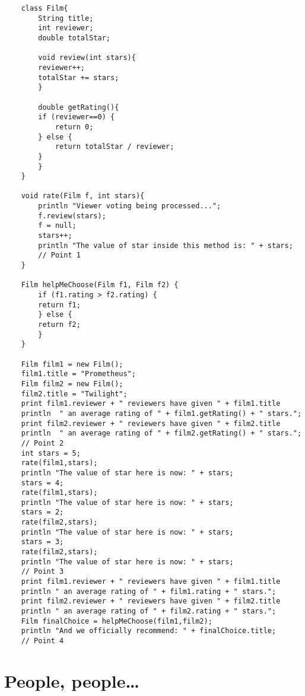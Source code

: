 \documentclass{article}
\begin{document}
\begin{verbatim}
    class Film{
        String title;
        int reviewer;
        double totalStar;     
      
        void review(int stars){
        reviewer++;
        totalStar += stars;
        }
      
        double getRating(){
        if (reviewer==0) {
            return 0;
        } else {
            return totalStar / reviewer;
        }
        }
    }
    
    void rate(Film f, int stars){
        println "Viewer voting being processed...";
        f.review(stars);
        f = null;
        stars++;
        println "The value of star inside this method is: " + stars;
        // Point 1
    }
    
    Film helpMeChoose(Film f1, Film f2) {
        if (f1.rating > f2.rating) {
        return f1;
        } else {
        return f2;
        }
    }
    
    Film film1 = new Film();
    film1.title = "Prometheus";
    Film film2 = new Film();
    film2.title = "Twilight";
    print film1.reviewer + " reviewers have given " + film1.title
    println  " an average rating of " + film1.getRating() + " stars.";
    print film2.reviewer + " reviewers have given " + film2.title
    println  " an average rating of " + film2.getRating() + " stars.";
    // Point 2
    int stars = 5;
    rate(film1,stars);
    println "The value of star here is now: " + stars;
    stars = 4;
    rate(film1,stars);
    println "The value of star here is now: " + stars;
    stars = 2;
    rate(film2,stars);
    println "The value of star here is now: " + stars;
    stars = 3;
    rate(film2,stars);
    println "The value of star here is now: " + stars;
    // Point 3
    print film1.reviewer + " reviewers have given " + film1.title
    println " an average rating of " + film1.rating + " stars.";
    print film2.reviewer + " reviewers have given " + film2.title
    println " an average rating of " + film2.rating + " stars.";
    Film finalChoice = helpMeChoose(film1,film2);
    println "And we officially recommend: " + finalChoice.title;
    // Point 4
\end{verbatim}


\section{People, people\ldots}
\label{sec:people-peopleldots}
\end{document}
